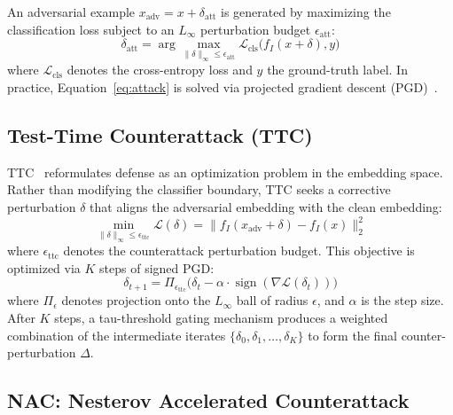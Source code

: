 \documentclass[pdflatex,sn-basic,Numbered]{sn-jnl}
\theoremstyle{thmstyleone}
\theoremstyle{thmstyletwo}
\theoremstyle{thmstylethree}
\begin{document}
An adversarial example $x_{\text{adv}} = x + \delta_{\text{att}}$ is generated by maximizing the classification loss subject to an $L_\infty$ perturbation budget $\epsilon_{\text{att}}$:
\begin{equation}
\delta_{\text{att}} = \arg\max_{\|\delta\|_\infty \leq \epsilon_{\text{att}}} \mathcal{L}_{\text{cls}}\big(f_I(x+\delta), y\big) \label{eq:attack}
\end{equation}
where $\mathcal{L}_{\text{cls}}$ denotes the cross-entropy loss and $y$ the ground-truth label. In practice, Equation~\ref{eq:attack} is solved via projected gradient descent (PGD)~\cite{madry2018towards}.

\subsection{Test-Time Counterattack (TTC)}

TTC~\cite{xing2025clip} reformulates defense as an optimization problem in the embedding space. Rather than modifying the classifier boundary, TTC seeks a corrective perturbation $\delta$ that aligns the adversarial embedding with the clean embedding:
\begin{equation}
\min_{\|\delta\|_\infty \leq \epsilon_{\text{ttc}}} \mathcal{L}(\delta) = \big\|f_I(x_{\text{adv}} + \delta) - f_I(x)\big\|^2_2 \label{eq:ttc_obj}
\end{equation}
where $\epsilon_{\text{ttc}}$ denotes the counterattack perturbation budget. This objective is optimized via $K$ steps of signed PGD:
\begin{equation}
\delta_{t+1} = \Pi_{\epsilon_{\text{ttc}}}\!\big(\delta_t - \alpha \cdot \operatorname{sign}(\nabla \mathcal{L}(\delta_t))\big) \label{eq:pgd_update}
\end{equation}
where $\Pi_{\epsilon}$ denotes projection onto the $L_\infty$ ball of radius $\epsilon$, and $\alpha$ is the step size. After $K$ steps, a tau-threshold gating mechanism produces a weighted combination of the intermediate iterates $\{\delta_0, \delta_1, \dots, \delta_K\}$ to form the final counter-perturbation $\Delta$.

\subsection{NAC: Nesterov Accelerated Counterattack}
\end{document}
